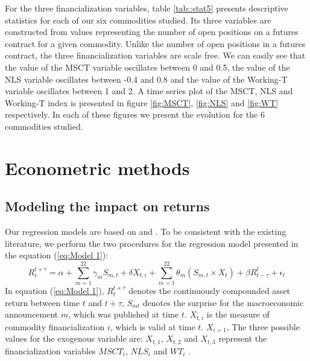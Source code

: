 \documentclass[12pt]{article}
\begin{document}
For the three financialization variables, table \ref{tab::stat5} presents descriptive statistics for each of our six commodities studied. Its three variables are constructed from values representing the number of open positions on a futures contract for a given commodity. Unlike the number of open positions in a futures contract, the three financialization variables are scale free. We can easily see that the value of the MSCT variable oscillates between 0 and 0.5, the value of the NLS variable oscillates between -0.4 and 0.8 and the value of the Working-T variable oscillates between 1 and 2. A time series plot of the MSCT, NLS and Working-T index is presented in figure \ref{fig:MSCT}, \ref{fig:NLS} and \ref{fig:WT} respectively. In each of these figures we present the evolution for the 6 commodities studied.



\section{Econometric methods}
\subsection{Modeling the impact on returns}\label{return}

Our regression models are based on \citet{kurov2019price} and \citet{andersen2007real}. To be consistent with the existing literature, we perform the two procedures for the regression model presented in the equation (\ref{eq:Model 1}):
\begin{equation}\label{eq:Model 1}
R_{t}^{t+\tau}=\alpha+\sum_{m=1}^{22} \gamma_m S_{m,t}+ \delta X_{t,i} + \sum_{m=1}^{22} \theta_m (S_{m,t} \times X_t)+\beta R_{t-\tau}^{t}+\epsilon_{t} 
\end{equation}
In equation (\ref{eq:Model 1}), $R_{t}^{t+\tau}$ denotes the continuously compounded asset return between time $t$ and $t+\tau$, $S_{mt}$ denotes the surprise for the macroeconomic announcement $m$, which was published at time $t$. $X_{t,i}$ is the measure of commodity financialization $i$,  which is valid at time $t$. $X_{i = 1}$, The three possible values for the exogenous variable are:  $X_{t,1}$, $X_{t,2}$ and $X_{t,3}$ represent the financialization variables $MSCT_i$, $NLS_i$ and $WT_i$ . 
\end{document}
